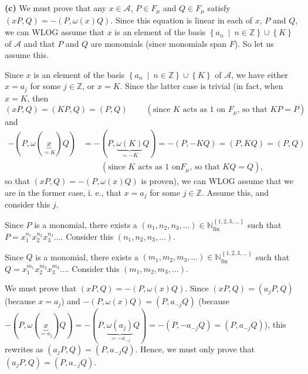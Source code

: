 \documentclass[etingof-lie.tex]{subfiles}
\begin{document}
\textbf{(c)} We must prove that any $x\in\mathcal{A}$, $P\in F_{\mu}$ and
$Q\in F_{\mu}$ satisfy $\left(  xP,Q\right)  =-\left(  P,\omega\left(
x\right)  Q\right)  $. Since this equation is linear in each of $x$, $P$ and
$Q$, we can WLOG assume that $x$ is an element of the basis $\left\{
a_{n}\ \mid\ n\in\mathbb{Z}\right\}  \cup\left\{  K\right\}  $ of
$\mathcal{A}$ and that $P$ and $Q$ are monomials (since monomials span $F$).
So let us assume this.

Since $x$ is an element of the basis $\left\{  a_{n}\ \mid\ n\in
\mathbb{Z}\right\}  \cup\left\{  K\right\}  $ of $\mathcal{A}$, we have either
$x=a_{j}$ for some $j\in\mathbb{Z}$, or $x=K$. Since the latter case is
trivial (in fact, when $x=K$, then%
\[
\left(  xP,Q\right)  =\left(  KP,Q\right)  =\left(  P,Q\right)
\ \ \ \ \ \ \ \ \ \ \left(  \text{since }K\text{ acts as }1\text{ on }F_{\mu
}\text{, so that }KP=P\right)
\]
and%
\begin{align*}
-\left(  P,\omega\left(  \underbrace{x}_{=K}\right)  Q\right)   &  =-\left(
P,\underbrace{\omega\left(  K\right)  }_{=-K}Q\right)  =-\left(  P,-KQ\right)
=\left(  P,KQ\right)  =\left(  P,Q\right) \\
&  \ \ \ \ \ \ \ \ \ \ \left(  \text{since }K\text{ acts as }1\text{ on
}F_{\mu}\text{, so that }KQ=Q\right)  ,
\end{align*}
so that $\left(  xP,Q\right)  =-\left(  P,\omega\left(  x\right)  Q\right)  $
is proven), we can WLOG assume that we are in the former case, i. e., that
$x=a_{j}$ for some $j\in\mathbb{Z}$. Assume this, and consider this $j$.

Since $P$ is a monomial, there exists a $\left(  n_{1},n_{2},n_{3},...\right)
\in\mathbb{N}_{\operatorname*{fin}}^{\left\{  1,2,3,...\right\}  }$ such that
$P=x_{1}^{n_{1}}x_{2}^{n_{2}}x_{3}^{n_{3}}...$. Consider this $\left(
n_{1},n_{2},n_{3},...\right)  $.

Since $Q$ is a monomial, there exists a $\left(  m_{1},m_{2},m_{3},...\right)
\in\mathbb{N}_{\operatorname*{fin}}^{\left\{  1,2,3,...\right\}  }$ such that
$Q=x_{1}^{m_{1}}x_{2}^{m_{2}}x_{3}^{m_{3}}...$. Consider this $\left(
m_{1},m_{2},m_{3},...\right)  $.

We must prove that $\left(  xP,Q\right)  =-\left(  P,\omega\left(  x\right)
Q\right)  $. Since $\left(  xP,Q\right)  =\left(  a_{j}P,Q\right)  $ (because
$x=a_{j}$) and $-\left(  P,\omega\left(  x\right)  Q\right)  =\left(
P,a_{-j}Q\right)  $ (because $-\left(  P,\omega\left(  \underbrace{x}_{=a_{j}%
}\right)  Q\right)  =-\left(  P,\underbrace{\omega\left(  a_{j}\right)
}_{=-a_{-j}}Q\right)  =-\left(  P,-a_{-j}Q\right)  =\left(  P,a_{-j}Q\right)
$), this rewrites as $\left(  a_{j}P,Q\right)  =\left(  P,a_{-j}Q\right)  $.
Hence, we must only prove that $\left(  a_{j}P,Q\right)  =\left(
P,a_{-j}Q\right)  $.
\end{document}
